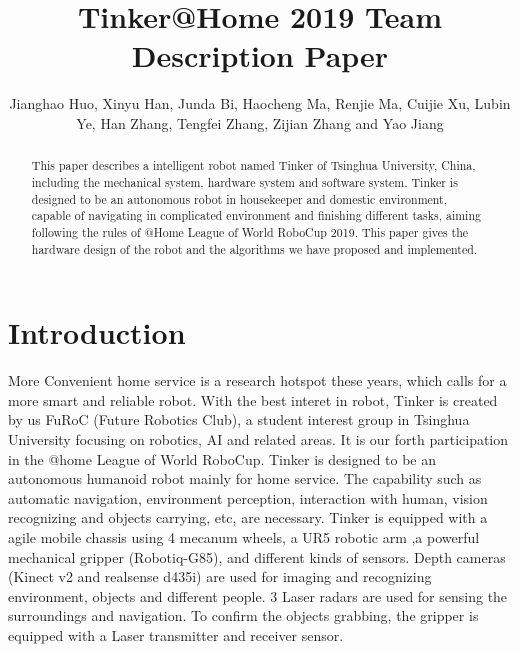 \documentclass[runningheads,a4paper]{llncs}
\begin{document}
	
\title{Tinker@Home 2019 Team Description Paper}
\author{Jianghao Huo, Xinyu Han, Junda Bi, Haocheng Ma, Renjie Ma, Cuijie Xu, Lubin Ye, Han Zhang, Tengfei Zhang, Zijian Zhang and Yao Jiang}
\maketitle

\begin{abstract}
This paper describes a intelligent robot named Tinker of Tsinghua University, China, including the mechanical system, hardware system and software system. Tinker is designed to be an autonomous robot in housekeeper and domestic environment, capable of navigating in complicated environment and finishing different tasks, aiming following the rules of @Home League of World RoboCup 2019. This paper gives the hardware design of the robot and the algorithms we have proposed and implemented.
\end{abstract}

\section{Introduction}
More Convenient home service is a research hotspot these years, which calls for a more smart and reliable robot. With the best interet in robot, Tinker is created by us FuRoC (Future Robotics Club), a student interest group in Tsinghua University focusing on robotics, AI and related areas. It is our forth participation in the @home League of World RoboCup. Tinker is designed to be an autonomous humanoid robot mainly for home service. The capability such as automatic navigation, environment perception, interaction with human, vision recognizing and objects carrying, etc, are necessary. Tinker is equipped with a agile mobile chassis using 4 mecanum wheels, a UR5 robotic arm ,a powerful  mechanical gripper (Robotiq-G85), and different kinds of sensors. Depth cameras (Kinect v2 and realsense d435i) are used for imaging and recognizing environment, objects and different people. 3 Laser radars  are used for sensing the surroundings and navigation. To confirm the objects grabbing, the gripper is equipped with a Laser transmitter and receiver sensor.
\end{document}
